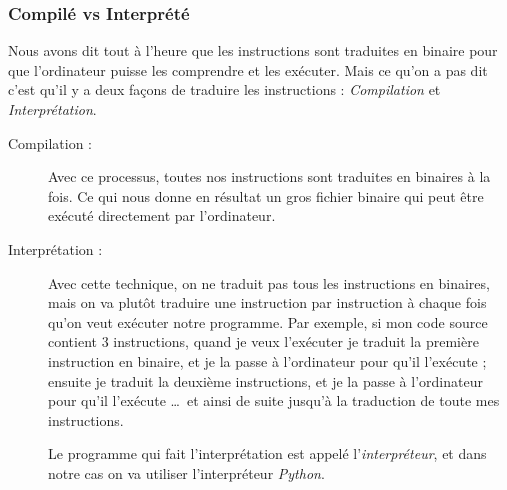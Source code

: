 \documentclass[12pt]{article}
\begin{document}
        \subsubsection{Compilé vs Interprété}
            Nous avons dit tout à l'heure que les instructions sont traduites en binaire pour que l'ordinateur puisse
            les comprendre et les exécuter. Mais ce qu'on a pas dit c'est qu'il y a deux façons de traduire
            les instructions : \emph{Compilation} et \emph{Interprétation}.

            \begin{description}
                \item[Compilation :] Avec ce processus, toutes nos instructions sont traduites en binaires à la fois.
                    Ce qui nous donne en résultat un gros fichier binaire qui peut être exécuté directement par
                    l'ordinateur.
                \item[Interprétation :] Avec cette technique, on ne traduit pas tous les instructions en binaires, mais
                    on va plutôt traduire une instruction par instruction à chaque fois qu'on veut exécuter
                    notre programme. Par exemple, si mon code source contient 3 instructions, quand je veux l'exécuter je
                    traduit la première instruction en binaire, et je la passe à l'ordinateur pour qu'il l'exécute ;
                    ensuite je traduit la deuxième instructions, et je la passe à l'ordinateur pour qu'il l'exécute
                    \ldots\ et ainsi de suite jusqu'à la traduction de toute
                    mes instructions.

                    Le programme qui fait l'interprétation est appelé l'\emph{interpréteur}, et dans notre cas on va utiliser
                    l'interpréteur \emph{Python}.
            \end{description}
\end{document}
